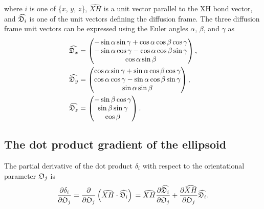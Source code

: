 \noindent where $i$ is one of \{$x$, $y$, $z$\}, $\widehat{XH}$ is a unit vector parallel to the XH bond vector, and $\widehat{\mathfrak{D}_i}$ is one of the unit vectors defining the diffusion frame.  The three diffusion frame unit vectors can be expressed using the Euler angles $\alpha$, $\beta$, and $\gamma$ as
\begin{subequations}
\begin{align}
    \widehat{\mathfrak{D}_x} &= \begin{pmatrix}
        -\sin \alpha \sin \gamma + \cos \alpha \cos \beta \cos \gamma \\
        -\sin \alpha \cos \gamma - \cos \alpha \cos \beta \sin \gamma \\
        \cos \alpha \sin \beta \\
    \end{pmatrix}, \\
    \widehat{\mathfrak{D}_y} &= \begin{pmatrix}
        \cos \alpha \sin \gamma + \sin \alpha \cos \beta \cos \gamma \\
        \cos \alpha \cos \gamma - \sin \alpha \cos \beta \sin \gamma \\
        \sin \alpha \sin \beta \\
    \end{pmatrix}, \\
    \widehat{\mathfrak{D}_z} &= \begin{pmatrix}
        -\sin \beta \cos \gamma \\
        \sin \beta \sin \gamma \\
        \cos \beta \\
    \end{pmatrix}.
\end{align}
\end{subequations}




\subsection{The dot product gradient of the ellipsoid}

The partial derivative of the dot product $\delta_i$ with respect to the orientational parameter $\mathfrak{O}_j$ is
\begin{equation}
    \frac{\partial \delta_i}{\partial \mathfrak{O}_j}
        = \frac{\partial}{\partial \mathfrak{O}_j} \left( \widehat{XH} \cdot \widehat{\mathfrak{D}_i} \right) \\
        = \widehat{XH} \frac{\partial \widehat{\mathfrak{D}_i}}{\partial \mathfrak{O}_j}  +  \frac{\partial \widehat{XH}}{\partial \mathfrak{O}_j} \widehat{\mathfrak{D}_i}.
\end{equation}

